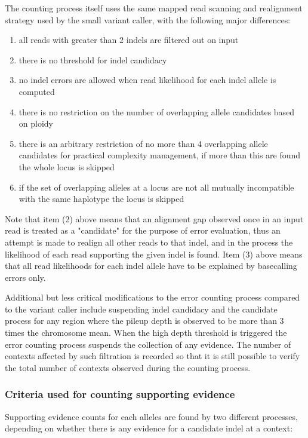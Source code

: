 \documentclass{article}
\begin{document}
The counting process itself uses the same mapped read scanning and realignment strategy used by the small variant caller, with the following major differences:
 \begin{enumerate}
 \item all reads with greater than 2 indels are filtered out on input
 \item there is no threshold for indel candidacy
 \item no indel errors are allowed when read likelihood for each indel allele is computed
 \item there is no restriction on the number of overlapping allele candidates based on ploidy
 \item there is an arbitrary restriction of no more than 4 overlapping allele candidates for practical complexity management, if more than this are found the whole locus is skipped
 \item if the set of overlapping alleles at a locus are not all mutually incompatible with the same haplotype the locus is skipped
 \end{enumerate}
Note that item (2) above means that an alignment gap observed once in an input read is treated as a "candidate" for the purpose of error evaluation, thus an attempt is made to realign all other reads to that indel, and in the process the likelihood of each read supporting the given indel is found. Item (3) above means that all read likelihoods for each indel allele have to be explained by basecalling errors only.

Additional but less critical modifications to the error counting process compared to the variant caller include suspending indel candidacy and the candidate process for any region where the pileup depth is observed to be more than 3 times the chromosome mean. When the high depth threshold is triggered the error counting process suspends the collection of any evidence. The number of contexts affected by such filtration is recorded so that it is still possible to verify the total number of contexts observed during the counting process.

\subsubsection{Criteria used for counting supporting evidence}

Supporting evidence counts for each alleles are found by two different processes, depending on whether there is any evidence for a candidate indel at a context:
\end{document}
